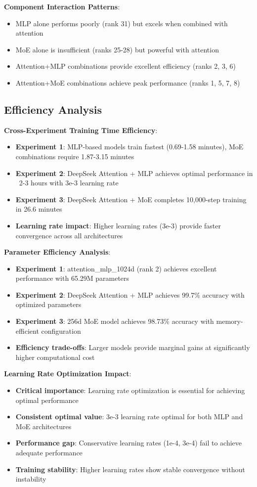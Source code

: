 \documentclass[11pt,a4paper]{article}
\begin{document}
\textbf{Component Interaction Patterns}:
\begin{itemize}
    \item MLP alone performs poorly (rank 31) but excels when combined with attention
    \item MoE alone is insufficient (ranks 25-28) but powerful with attention
    \item Attention+MLP combinations provide excellent efficiency (ranks 2, 3, 6)
    \item Attention+MoE combinations achieve peak performance (ranks 1, 5, 7, 8)
\end{itemize}

\subsection{Efficiency Analysis}

\textbf{Cross-Experiment Training Time Efficiency}:
\begin{itemize}
    \item \textbf{Experiment 1}: MLP-based models train fastest (0.69-1.58 minutes), MoE combinations require 1.87-3.15 minutes
    \item \textbf{Experiment 2}: DeepSeek Attention + MLP achieves optimal performance in ~2-3 hours with 3e-3 learning rate
    \item \textbf{Experiment 3}: DeepSeek Attention + MoE completes 10,000-step training in 26.6 minutes
    \item \textbf{Learning rate impact}: Higher learning rates (3e-3) provide faster convergence across all architectures
\end{itemize}

\textbf{Parameter Efficiency Analysis}:
\begin{itemize}
    \item \textbf{Experiment 1}: attention\_mlp\_1024d (rank 2) achieves excellent performance with 65.29M parameters
    \item \textbf{Experiment 2}: DeepSeek Attention + MLP achieves 99.7\% accuracy with optimized parameters
    \item \textbf{Experiment 3}: 256d MoE model achieves 98.73\% accuracy with memory-efficient configuration
    \item \textbf{Efficiency trade-offs}: Larger models provide marginal gains at significantly higher computational cost
\end{itemize}

\textbf{Learning Rate Optimization Impact}:
\begin{itemize}
    \item \textbf{Critical importance}: Learning rate optimization is essential for achieving optimal performance
    \item \textbf{Consistent optimal value}: 3e-3 learning rate optimal for both MLP and MoE architectures
    \item \textbf{Performance gap}: Conservative learning rates (1e-4, 3e-4) fail to achieve adequate performance
    \item \textbf{Training stability}: Higher learning rates show stable convergence without instability
\end{itemize}
\end{document}
